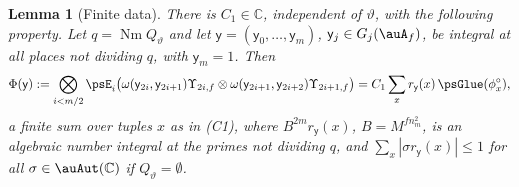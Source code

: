 \documentclass[10pt]{amsart}
\newtheorem{lemma}[theorem]{Lemma}
\theoremstyle{definition}
\theoremstyle{remark}
\newcommand{\C}{\mathbb C}
\providecommand{\auNm}{\operatorname{Nm}}
\begin{document}
\begin{lemma}[Finite data]\label{ps:fin}
There is $C_1\in\C$, independent of $\vartheta$, with the following property. Let
$q=\auNm Q_\vartheta$ and let $\mathsf y=(\mathsf y_0,\dots,\mathsf y_m)$, $\mathsf y_j\in
G_j(\auA_f)$, be integral at all places not dividing $q$, with $\mathsf y_m=1$. Then
\[
\Phi(\mathsf y):=\bigotimes_{i<m/2}\psE_i\bigl(\omega(\mathsf y_{2i},\mathsf y_{2i+1})\Upsilon_{2i,f}
\otimes\omega(\mathsf y_{2i+1},\mathsf y_{2i+2})\Upsilon_{2i+1,f}\bigr)=C_1\sum_xr_{\mathsf y}(x)\,
\psGlue(\phi^\circ_x),
\]
a finite sum over tuples $x$ as in (C1), where $B^{2m}r_{\mathsf y}(x)$, $B=M^{fn_m^2}$, is an
algebraic number integral at the primes not dividing $q$, and $\sum_x|\sigma r_{\mathsf y}(x)|\le1$
for all $\sigma\in\auAut(\C)$ if $Q_\vartheta=\emptyset$.
\end{lemma}
\end{document}
